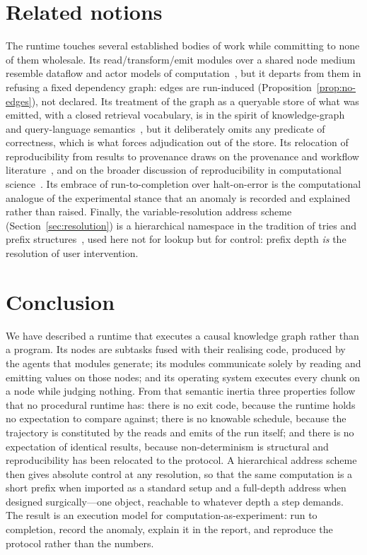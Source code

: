 \documentclass[11pt,a4paper,twocolumn]{article}
\theoremstyle{definition}
\begin{document}
\section{Related notions}
\label{sec:related}

The runtime touches several established bodies of work while committing to none
of them wholesale. Its read/transform/emit modules over a shared node medium
resemble dataflow and actor models of computation~\cite{kahn1974semantics,
lee1995dataflow, hewitt1973actor, agha1986actors}, but it departs from them in
refusing a fixed dependency graph: edges are run-induced
(Proposition~\ref{prop:no-edges}), not declared. Its treatment of the graph as a
queryable store of what was emitted, with a closed retrieval
vocabulary, is in the spirit of knowledge-graph and query-language
semantics~\cite{hogan2021knowledge, perez2009sparql}, but it deliberately omits
any predicate of correctness, which is what forces adjudication out of the store.
Its relocation of reproducibility from results to provenance draws on the
provenance and workflow literature~\cite{moreau2013prov, davidson2008provenance},
and on the broader discussion of reproducibility in computational
science~\cite{peng2011reproducible, sandve2013reproducible}. Its embrace of
run-to-completion over halt-on-error is the computational analogue of the
experimental stance that an anomaly is recorded and explained rather than
raised. Finally, the variable-resolution address scheme
(Section~\ref{sec:resolution}) is a hierarchical namespace in the tradition of
tries and prefix structures~\cite{fredkin1960trie}, used here not for lookup but
for control: prefix depth \emph{is} the resolution of user intervention.

\section{Conclusion}
\label{sec:conclusion}

We have described a runtime that executes a causal knowledge graph rather than a
program. Its nodes are subtasks fused with their realising code, produced by the
agents that modules generate; its modules communicate solely by reading and
emitting values on those nodes; and its operating system executes every chunk on
a node while judging nothing. From that semantic inertia three properties follow
that no procedural runtime has: there is no exit code, because the runtime holds
no expectation to compare against; there is no knowable schedule, because the
trajectory is constituted by the reads and emits of the run itself; and there is
no expectation of identical results, because non-determinism is structural and
reproducibility has been relocated to the protocol. A hierarchical address scheme
then gives absolute control at any resolution, so that the same computation is a
short prefix when imported as a standard setup and a full-depth address when
designed surgically---one object, reachable to whatever depth a step demands.
The result is an execution model for computation-as-experiment: run to
completion, record the anomaly, explain it in the report, and reproduce the
protocol rather than the numbers.



\end{document}
